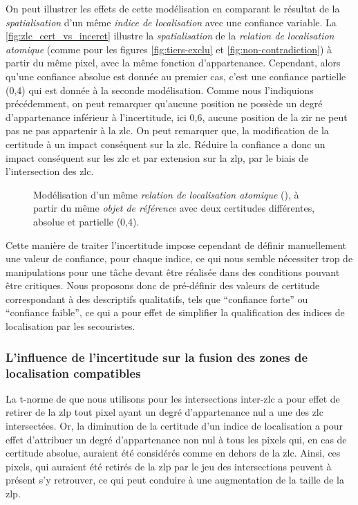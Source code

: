 {On peut illustrer les effets de cette modélisation en comparant le
résultat de la \emph{spatialisation} d'un même \emph{indice de
  localisation} avec une confiance variable. La
\autoref{fig:zlc_cert_vs_inceret} illustre la \emph{spatialisation} de
la \emph{relation de localisation atomique} 
(comme pour les figures \ref{fig:tiers-exclu} et
\ref{fig:non-contradiction}) à partir du même pixel, avec la même
fonction d'appartenance. Cependant, alors qu'une confiance absolue est
donnée au premier cas, c'est une confiance partielle (0,4) qui est
donnée à la seconde modélisation. Comme nous l'indiquions
précédemment, on peut remarquer qu'aucune position ne possède un degré
d'appartenance inférieur à l'incertitude, ici 0,6, aucune position de
la \ac{zir} ne peut pas ne pas appartenir à la \ac{zlc}. On peut
remarquer que, la modification de la certitude à un impact conséquent
sur la \ac{zlc}. Réduire la confiance a donc un impact conséquent sur
les \ac{zlc} et par extension sur la \ac{zlp}, par le biais de
l'intersection des \ac{zlc}.

\begin{figure}
  \centering
  \subfloat[]{}\hspace{2cm}
  \subfloat[]{}
  \caption{Modélisation d'un même \emph{relation de localisation
      atomique} (\protect{}), à partir du même
    \emph{objet de référence} avec deux certitudes différentes,
    absolue et partielle (0,4).}
  \label{fig:zlc_cert_vs_inceret}
\end{figure}

Cette manière de traiter l'incertitude impose cependant de définir
manuellement une valeur de confiance, pour chaque indice, ce qui nous
semble nécessiter trop de manipulations pour une tâche devant être
réalisée dans des conditions pouvant être critiques. Nous proposons
donc de pré-définir des valeurs de certitude correspondant à des
descriptifs qualitatifs, tels que \enquote{confiance forte} ou
\enquote{confiance faible}, ce qui a pour effet de simplifier la
qualification des indices de localisation par les secouristes.

\subsubsection{L'influence de l'incertitude sur la fusion des zones de
  localisation compatibles}

La t-norme de  que nous utilisons pour les intersections
inter-\ac{zlc} a pour effet de retirer de la \ac{zlp} tout pixel ayant
un degré d'appartenance nul a une des \ac{zlc} intersectées. Or, la
diminution de la certitude d'un indice de localisation a pour effet
d'attribuer un degré d'appartenance non nul à tous les pixels qui, en
cas de certitude absolue, auraient été considérés comme en dehors de
la \ac{zlc}. Ainsi, ces pixels, qui auraient été retirés de la
\ac{zlp} par le jeu des intersections peuvent à présent s'y retrouver,
ce qui peut conduire à une augmentation de la taille de la \ac{zlp}.

}
